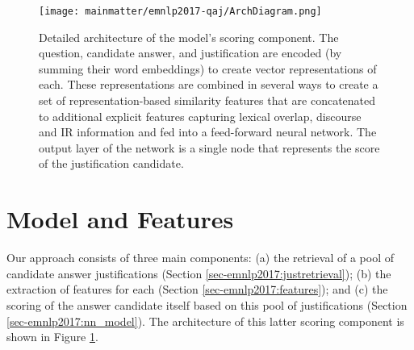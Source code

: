 
\begin{figure}[t]
\begin{center}
\texttt{[image: mainmatter/emnlp2017-qaj/ArchDiagram.png]}
\caption{ Detailed architecture of the model's scoring component.  
The question, candidate answer, and justification %
 are encoded (by summing their word embeddings) to create vector representations of each. These representations are combined in several ways to create a set of representation-based similarity features that are concatenated to additional explicit features capturing lexical overlap, discourse and IR information and fed into a feed-forward neural network.  The output layer of the network is a single node that represents the score of the justification candidate.}  %
\label{fig:arch}
\end{center}
\end{figure}


\section{Model and Features}
\label{sec-emnlp2017:pipeline}
Our approach consists of three main components: (a) the retrieval of a pool of candidate answer justifications (Section \ref{sec-emnlp2017:justretrieval}); (b) the extraction of features for each (Section \ref{sec-emnlp2017:features}); and (c) the scoring of the answer candidate itself based on this pool of justifications (Section \ref{sec-emnlp2017:nn_model}).  The architecture of this latter scoring component is shown in Figure \ref{fig:arch}. 



